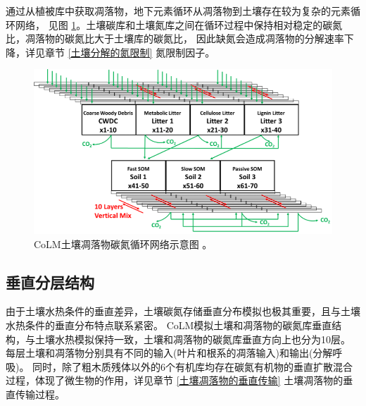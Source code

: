通过从植被库中获取凋落物，地下元素循环从凋落物到土壤存在较为复杂的元素循环网络，
见图 \ref{fig:CoLM土壤凋落物碳氮循环网络示意图}。土壤碳库和土壤氮库之间在循环过程中保持相对稳定的碳氮比，凋落物的碳氮比大于土壤库的碳氮比，
因此缺氮会造成凋落物的分解速率下降，详见章节 \ref{土壤分解的氮限制} 氮限制因子。
{
\begin{figure}[]
\centering
\includegraphics{Figures/碳氮库结构/CoLM土壤凋落物碳氮循环网络示意图.png}
\caption{CoLM土壤凋落物碳氮循环网络示意图 \citep{huang2018matrix}。  }
\label{fig:CoLM土壤凋落物碳氮循环网络示意图}
\end{figure}
}
\subsection{垂直分层结构}\label{垂直分层结构}
由于土壤水热条件的垂直差异，土壤碳氮存储垂直分布模拟也极其重要，且与土壤水热条件的垂直分布特点联系紧密。
CoLM模拟土壤和凋落物的碳氮库垂直结构，与土壤水热模拟保持一致，土壤和凋落物的碳氮库垂直方向上也分为10层。
每层土壤和凋落物分别具有不同的输入(叶片和根系的凋落输入)和输出(分解呼吸)。
同时，除了粗木质残体以外的6个有机库均存在碳氮有机物的垂直扩散混合过程，体现了微生物的作用，详见章节 \ref{土壤凋落物的垂直传输} 土壤凋落物的垂直传输过程。
